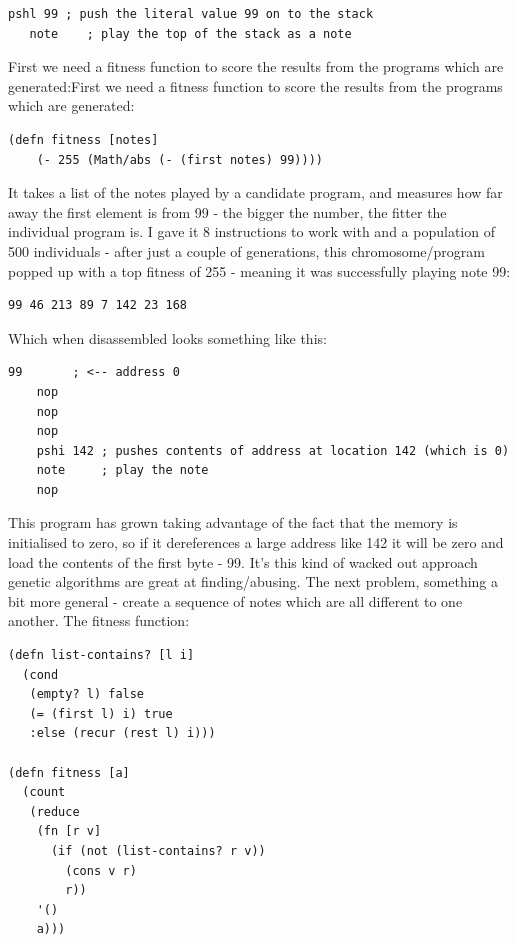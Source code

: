 \documentclass[letterpaper, 12pt]{article}
\begin{document}
\begin{Verbatim}[fontfamily=courier, xleftmargin=\parindent]
   pshl 99 ; push the literal value 99 on to the stack
   note    ; play the top of the stack as a note 
\end{Verbatim}

First we need a fitness function to score the results from the programs which are generated:First we need a fitness function to score the results from the programs which are generated:

\begin{Verbatim}[fontfamily=courier, xleftmargin=\parindent]
(defn fitness [notes]
    (- 255 (Math/abs (- (first notes) 99))))
\end{Verbatim}

It takes a list of the notes played by a candidate program, and measures how far away the first element is from 99 - the bigger the number, the fitter the individual program is. I gave it 8 instructions to work with and a population of 500 individuals - after just a couple of generations, this chromosome/program popped up with a top fitness of 255 - meaning it was successfully playing note 99:

\begin{Verbatim}[fontfamily=courier, xleftmargin=\parindent]
99 46 213 89 7 142 23 168
\end{Verbatim}

Which when disassembled looks something like this:
\begin{Verbatim}[fontfamily=courier, xleftmargin=\parindent]
    99       ; <-- address 0 
    nop
    nop
    nop
    pshi 142 ; pushes contents of address at location 142 (which is 0)
    note     ; play the note
    nop
\end{Verbatim}

This program has grown taking advantage of the fact that the memory is initialised to zero, so if it dereferences a large address like 142 it will be zero and load the contents of the first byte - 99. It's this kind of wacked out approach genetic algorithms are great at finding/abusing.
The next problem, something a bit more general - create a sequence of notes which are all different to one another. The fitness function:

\begin{Verbatim}[fontfamily=courier, xleftmargin=\parindent]
(defn list-contains? [l i]
  (cond
   (empty? l) false
   (= (first l) i) true
   :else (recur (rest l) i)))

(defn fitness [a]
  (count
   (reduce
    (fn [r v]
      (if (not (list-contains? r v))
        (cons v r)
        r))
    '()
    a)))
\end{Verbatim}
\end{document}
